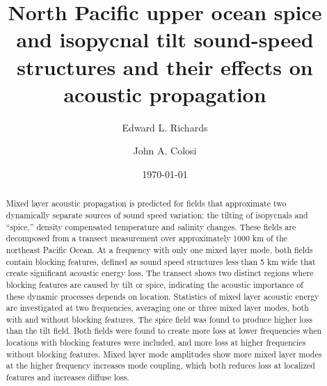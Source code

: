 \documentclass[preprint,NumberedRefs]{JASA}
\begin{document}
\title[Mixed layer tilt and spice]{North Pacific upper ocean spice and isopycnal tilt sound-speed structures and their effects on acoustic propagation}
\author{Edward L. Richards}
\author{John A. Colosi}


\date{\today}


\begin{abstract}
Mixed layer acoustic propagation is predicted for fields that approximate two dynamically separate sources of sound speed variation: the tilting of isopycnals and “spice,” density compensated temperature and salinity changes. These fields are decomposed from a transect measurement over approximately 1000 km of the northeast Pacific Ocean. At a frequency with only one mixed layer mode, both fields contain blocking features, defined as sound speed structures less than 5 km wide that create significant acoustic energy loss. The transect shows two distinct regions where blocking features are caused by tilt or spice, indicating the acoustic importance of these dynamic processes depends on location. Statistics of mixed layer acoustic energy are investigated at two frequencies, averaging one or three mixed layer modes, both with and without blocking features. The spice field was found to produce higher loss than the tilt field. Both fields were found to create more loss at lower frequencies when locations with blocking features were included, and more loss at higher frequencies without blocking features. Mixed layer mode amplitudes show more mixed layer modes at the higher frequency increases mode coupling, which both reduces loss at localized features and increases diffuse loss.

\end{abstract}

\maketitle
\end{document}
